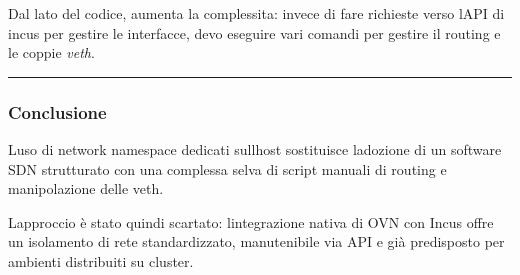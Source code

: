 Dal lato del codice, aumenta la complessita: invece di fare richieste
verso l\textquotesingle API di incus per gestire le interfacce, devo
eseguire vari comandi per gestire il routing e le coppie \emph{veth}.

\begin{center}\rule{0.5\linewidth}{0.5pt}\end{center}

\subsubsection{Conclusione}\label{conclusione}

L\textquotesingle uso di network namespace dedicati
sull\textquotesingle host sostituisce l\textquotesingle adozione di un
software SDN strutturato con una complessa selva di script manuali di
routing e manipolazione delle veth.

L\textquotesingle approccio è stato quindi scartato:
l\textquotesingle integrazione nativa di OVN con Incus offre un
isolamento di rete standardizzato, manutenibile via API e già
predisposto per ambienti distribuiti su cluster.
